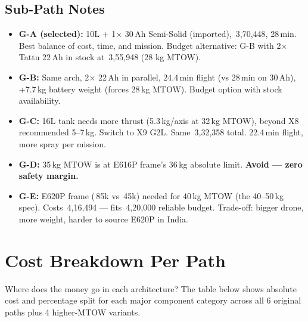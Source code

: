 \documentclass[11pt,a4paper]{article}
\newcommand{\Rs}{\rupee\,}
\begin{document}
\subsection{Sub-Path Notes}
\begin{itemize}
  \item \textbf{G-A (selected):} 10L + 1$\times$ 30\,Ah Semi-Solid (imported), \Rs{}3,70,448, 28\,min. Best balance of cost, time, and mission. Budget alternative: G-B with 2$\times$ Tattu 22\,Ah in stock at \Rs{}3,55,948 (28 kg MTOW).
  \item \textbf{G-B:} Same arch, 2$\times$ 22\,Ah in parallel, 24.4\,min flight (vs 28\,min on 30\,Ah), +7.7\,kg battery weight (forces 28\,kg MTOW). Budget option with stock availability.
  \item \textbf{G-C:} 16L tank needs more thrust (5.3\,kg/axis at 32\,kg MTOW), beyond X8 recommended 5--7\,kg. Switch to X9 G2L. Same \Rs{}3,32,358 total. 22.4\,min flight, more spray per mission.
  \item \textbf{G-D:} 35\,kg MTOW is at E616P frame's 36\,kg absolute limit. \textbf{Avoid --- zero safety margin.}
  \item \textbf{G-E:} E620P frame (\Rs{}85k vs \Rs{}45k) needed for 40\,kg MTOW (the 40--50\,kg spec). Costs \Rs{}4,16,494 --- fits \Rs{}4,20,000 reliable budget. Trade-off: bigger drone, more weight, harder to source E620P in India.
\end{itemize}

\section{Cost Breakdown Per Path}

Where does the money go in each architecture? The table below shows absolute cost and percentage split for each major component category across all 6 original paths plus 4 higher-MTOW variants.
\end{document}
